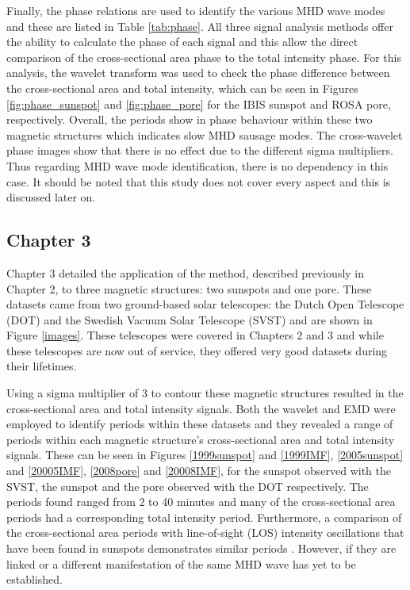     Finally, the phase relations are used to identify the various MHD wave modes and these are listed in Table \ref{tab:phase}.
    All three signal analysis methods offer the ability to calculate the phase of each signal and this allow the direct comparison of the cross-sectional area phase to the total intensity phase.
    For this analysis, the wavelet transform was used to check the phase difference between the cross-sectional area and total intensity, which can be seen in Figures \ref{fig:phase_sunspot} and \ref{fig:phase_pore} for the IBIS sunspot and ROSA pore, respectively.
    Overall, the periods show in phase behaviour within these two magnetic structures which indicates slow MHD sausage modes. 
    The cross-wavelet phase images show that there is no effect due to the different sigma multipliers. 
    Thus regarding MHD wave mode identification, there is no dependency in this case.
    It should be noted that this study does not cover every aspect and this is discussed later on.

   	\subsection{Chapter 3}
    	
    Chapter 3 detailed the application of the method, described previously in Chapter 2, to three magnetic structures: two sunspots and one pore.
    These datasets came from two ground-based solar telescopes: the Dutch Open Telescope (DOT) and the Swedish Vacuum Solar Telescope (SVST) and are shown in Figure \ref{images}.
    These telescopes were covered in Chapters 2 and 3 and while these telescopes are now out of service, they offered very good datasets during their lifetimes.
    
    Using a sigma multiplier of 3 to contour these magnetic structures resulted in the cross-sectional area and total intensity signals.
    Both the wavelet and EMD were employed to identify periods within these datasets and they revealed a range of periods within each magnetic structure's cross-sectional area and total intensity signals.
    These can be seen in Figures \ref{1999sunspot} and \ref{1999IMF}, \ref{2005sunspot} and \ref{20005IMF}, \ref{2008pore} and \ref{20008IMF}, for the sunspot observed with the SVST, the sunspot and the pore observed with the DOT respectively.
    The periods found ranged from 2 to 40 minutes and many of the cross-sectional area periods had a corresponding total intensity period.
    Furthermore, a comparison of the cross-sectional area periods with line-of-sight (LOS) intensity oscillations that have been found in sunspots demonstrates similar periods \citep{kobanov}.
    However, if they are linked or a different manifestation of the same MHD wave has yet to be established.
   
